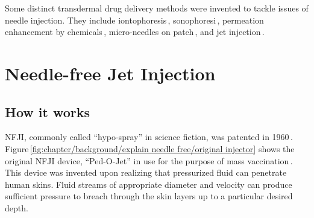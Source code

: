     Some distinct transdermal drug delivery methods were invented to tackle issues of needle injection. They include iontophoresis\,\cite{dhote2012}, sonophoresi\,\cite{bommanan1992}, permeation enhancement by chemicals\,\cite{karande2006}, micro-needles on patch\,\cite{cormier2004}, and jet injection\,\cite{taberner2006}. 

\section{Needle-free Jet Injection}                 \label{Chapter:background/needle-free jet injection}
    
    
    \subsection{How it works}                       \label{Chapter:background/needle-free jet injection/how it works}
    
        \ac{NFJI}, commonly called “hypo-spray” in science fiction, was patented in 1960\,\cite{ismach1962}. Figure\,\ref{fig:chapter/background/explain needle free/original injector} shows the original \acs{NFJI} device, “Ped-O-Jet” in use for the purpose of mass vaccination\,\cite{DictionnairesetEncyclopediessurAcademic}. This device was invented  upon realizing that pressurized fluid can penetrate human skins. Fluid streams of appropriate diameter and velocity can produce sufficient pressure to breach through the skin layers up to a particular desired depth. 
        
